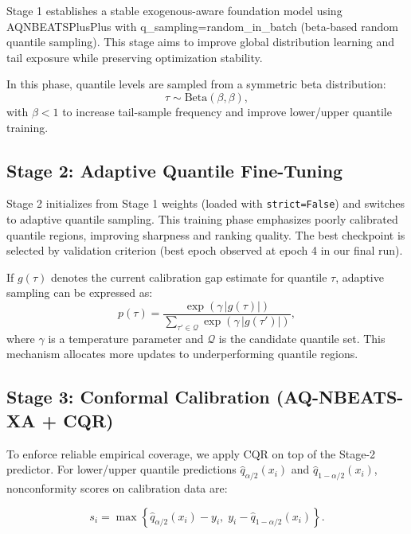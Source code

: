 Stage 1 establishes a stable exogenous-aware foundation model using
AQNBEATSPlusPlus with q\_sampling=random\_in\_batch (beta-based random quantile sampling).
This stage aims to improve global distribution learning and tail exposure
while preserving optimization stability.

In this phase, quantile levels are sampled from a symmetric beta distribution:
\begin{equation}
\tau \sim \mathrm{Beta}(\beta,\beta),
\label{eq:beta_sampling}
\end{equation}
with $\beta<1$ to increase tail-sample frequency and improve lower/upper
quantile training.

\subsection{Stage 2: Adaptive Quantile Fine-Tuning}
\label{subsec:stage2}

Stage 2 initializes from Stage 1 weights
(loaded with \texttt{strict=False}) and switches to adaptive quantile
sampling. This training phase emphasizes poorly calibrated quantile regions,
improving sharpness and ranking quality. The best checkpoint is selected by
validation criterion (best epoch observed at epoch 4 in our final run).

If $g(\tau)$ denotes the current calibration gap estimate for quantile
$\tau$, adaptive sampling can be expressed as:
\begin{equation}
p(\tau)=\frac{\exp\left(\gamma\,|g(\tau)|\right)}
{\sum_{\tau'\in\mathcal{Q}}\exp\left(\gamma\,|g(\tau')|\right)},
\label{eq:adaptive_sampling}
\end{equation}
where $\gamma$ is a temperature parameter and $\mathcal{Q}$ is the candidate
quantile set. This mechanism allocates more updates to underperforming
quantile regions.


\subsection{Stage 3: Conformal Calibration (AQ-NBEATS-XA + CQR)}
\label{subsec:stage3_cqr}

To enforce reliable empirical coverage, we apply CQR on top of the
Stage-2 predictor. For lower/upper quantile predictions
$\hat{q}_{\alpha/2}(x_i)$ and $\hat{q}_{1-\alpha/2}(x_i)$, nonconformity scores
on calibration data are:

\begin{equation}
s_i = \max\left\{\hat{q}_{\alpha/2}(x_i)-y_i,\; y_i-\hat{q}_{1-\alpha/2}(x_i)\right\}.
\label{eq:cqr_score_method}
\end{equation}

